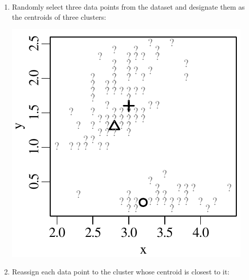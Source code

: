 \begin{enumerate}
\item Randomly select three data points from the dataset and designate
  them as the centroids of three clusters:

  \noindent\begin{minipage}[t][][b]{.25\linewidth}
  \includegraphics[width=\textwidth]{../figures/kmeans2.pdf}\medskip
  \end{minipage}
  \begin{minipage}[t][][t]{.75\linewidth}
    \label{fig:kmeans2}
  \end{minipage}
  
\item Reassign each data point to the cluster whose centroid is
  closest to it:


\end{enumerate}
